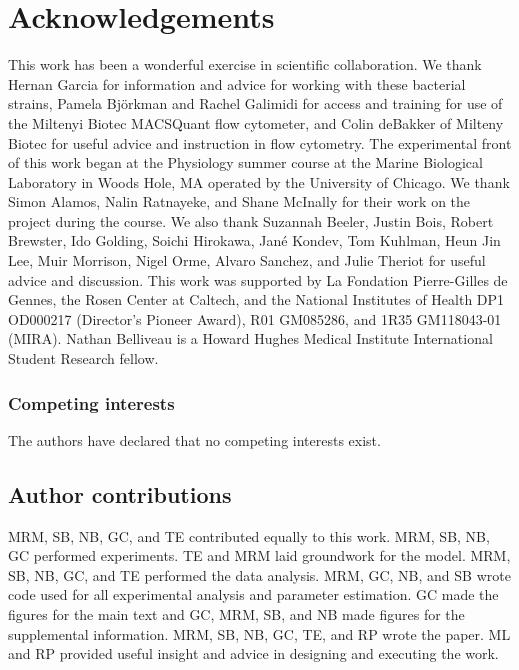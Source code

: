 \section*{Acknowledgements}

This work has been a wonderful exercise in scientific collaboration. We thank
Hernan Garcia for information and advice for working with these bacterial
strains, Pamela Bj\"{o}rkman and Rachel Galimidi for access and training for use
of the Miltenyi Biotec MACSQuant flow cytometer, and Colin deBakker of Milteny
Biotec for useful advice and instruction in flow cytometry. The experimental
front of this work began at the Physiology summer course at the Marine
Biological Laboratory in Woods Hole, MA operated by the University of Chicago.
We thank Simon Alamos, Nalin Ratnayeke, and Shane McInally for their work on the
project during the course. We also thank Suzannah Beeler, Justin Bois, Robert
Brewster, Ido Golding, Soichi Hirokawa, Jan\'{e} Kondev, Tom Kuhlman, Heun Jin Lee, Muir
Morrison, Nigel Orme, Alvaro Sanchez, and Julie Theriot for useful advice and discussion. This work was
supported by La Fondation Pierre-Gilles de Gennes, the Rosen Center at Caltech,
and the National Institutes of Health DP1 OD000217 (Director's Pioneer Award),
R01 GM085286, and 1R35 GM118043-01 (MIRA). Nathan Belliveau is a Howard Hughes
Medical Institute International Student Research fellow.

\subsubsection*{Competing interests}

The authors have declared that no competing interests exist.

\subsection*{Author contributions}

MRM, SB,  NB, GC, and TE contributed equally to this work. MRM, SB, NB, GC performed experiments. TE and MRM  laid groundwork for the model. MRM, SB, NB,  GC, and TE performed the  data analysis. MRM, GC, NB, and SB wrote  code  used for all experimental analysis and parameter estimation. GC made the figures for the main text and GC, MRM, SB, and NB  made figures for the supplemental information. MRM, SB, NB, GC, TE, and RP wrote the paper.  ML and RP provided useful insight and advice in designing and executing the work.

